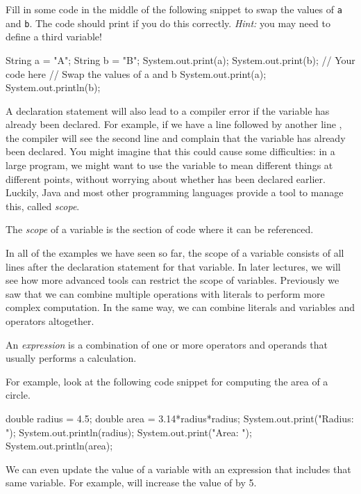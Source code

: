 \begin{example}	
  Fill in some code in the middle of the following snippet to swap the values of \texttt{a} and \texttt{b}. The code should print  if you do this correctly. \emph{Hint:} you may need to define a third variable!	
  \begin{code}	
    String a = "A";	
    String b = "B";	
    System.out.print(a);	
    System.out.print(b);	
    // Your code here	
    // Swap the values of a and b	
    System.out.print(a);	
    System.out.println(b);	
  \end{code}	
\end{example}	
A declaration statement will also lead to a compiler error if the variable has already been declared. For example, if we have a line  followed by another line , the compiler will see the second line and complain that the variable  has already been declared. You might imagine that this could cause some difficulties: in a large program, we might want to use the variable  to mean different things at different points, without worrying about whether  has been declared earlier. Luckily, Java and most other programming languages provide a tool to manage this, called \emph{scope}.	
\begin{definition}	
  The \emph{scope} of a variable is the section of code where it can be referenced.	
\end{definition}	
In all of the examples we have seen so far, the scope of a variable consists of all lines after the declaration statement for that variable. In later lectures, we will see how more advanced tools can restrict the scope of variables.	
Previously we saw that we can combine multiple operations with literals to perform more complex computation. In the same way, we can combine literals and variables and operators altogether.	
\begin{definition}	
An \emph{expression} is a combination of one or more operators and operands that usually performs a calculation.	
\end{definition}	
For example, look at the following code snippet for computing the area of a circle.	
\begin{code}	
  double radius = 4.5;	
  double area = 3.14*radius*radius;	
  System.out.print("Radius: ");	
  System.out.println(radius);	
  System.out.print("Area: ");	
  System.out.println(area);	
\end{code}	
We can even update the value of a variable with an expression that includes that same variable. For example,  will increase the value of  by 5.	
